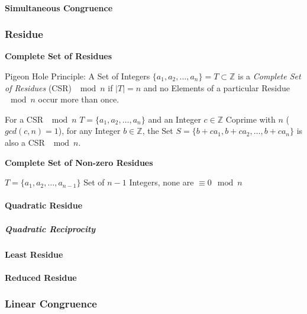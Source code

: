 \paragraph{Simultaneous Congruence}\label{sec:simultaneous_congruence}\hfill



\subsubsection{Residue}\label{sec:residue}

\textbf{Complete Set of Residues}

Pigeon Hole Principle: A Set of Integers $\{a_1, a_2, \ldots, a_n\} =
T \subset \mathbb{Z}$ is a \emph{Complete Set of Residues} (CSR)
$\mod n$ if $|T| = n$ and no Elements of a particular Residue
$\mod n$ occur more than once.

For a CSR $\mod n$ $T = \{a_1, a_2, \ldots, a_n\}$ and an
Integer $c \in \mathbb{Z}$ Coprime with $n$ ($gcd(c,n) = 1$), for any
Integer $b \in \mathbb{Z}$, the Set $S = \{b + ca_1, b + ca_2, \ldots,
b + ca_n \}$ is also a CSR $\mod n$.



\textbf{Complete Set of Non-zero Residues}

$T = \{ a_1, a_2, \ldots, a_{n-1} \}$ Set of $n-1$ Integers, none are
$\equiv 0 \mod n$



\paragraph{Quadratic Residue}\label{sec:quadratic_residue}\hfill

\subparagraph{Quadratic Reciprocity}\label{sec:quadratic_reciprocity}\hfill



\paragraph{Least Residue}\label{sec:least_residue}\hfill

\paragraph{Reduced Residue}\label{sec:reduced_residue}\hfill



\subsubsection{Linear Congruence}\label{sec:linear_congruence}

